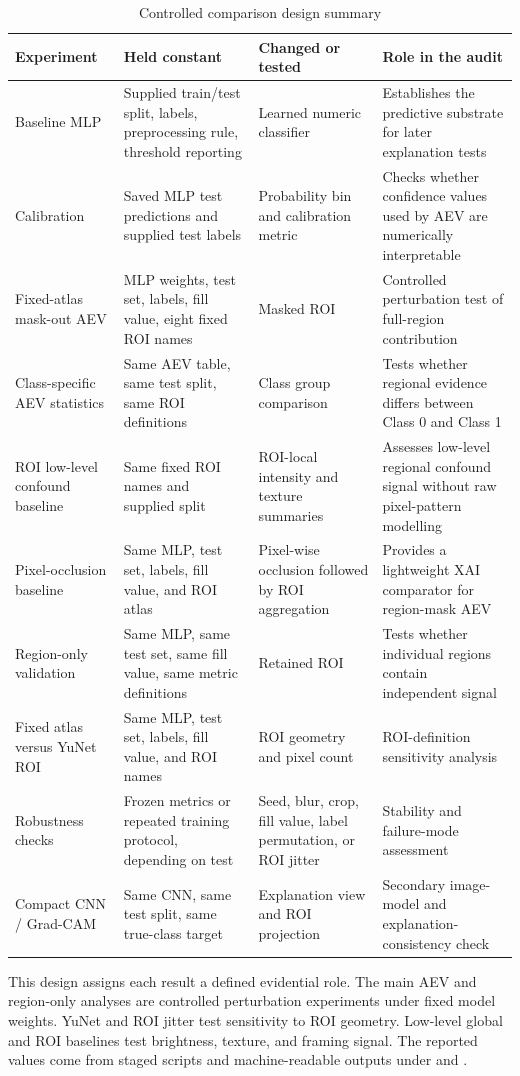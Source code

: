 \begin{table}[htbp]
\centering
\scriptsize
\caption{Controlled comparison design summary}
\begin{tabularx}{\textwidth}{>{\raggedright\arraybackslash}X>{\raggedright\arraybackslash}X>{\raggedright\arraybackslash}X>{\raggedright\arraybackslash}X}
\toprule
Experiment & Held constant & Changed or tested & Role in the audit \\
\midrule
Baseline MLP & Supplied train/test split, labels, preprocessing rule, threshold reporting & Learned numeric classifier & Establishes the predictive substrate for later explanation tests \\
Calibration & Saved MLP test predictions and supplied test labels & Probability bin and calibration metric & Checks whether confidence values used by AEV are numerically interpretable \\
Fixed-atlas mask-out AEV & MLP weights, test set, labels, fill value, eight fixed ROI names & Masked ROI & Controlled perturbation test of full-region contribution \\
Class-specific AEV statistics & Same AEV table, same test split, same ROI definitions & Class group comparison & Tests whether regional evidence differs between Class 0 and Class 1 \\
ROI low-level confound baseline & Same fixed ROI names and supplied split & ROI-local intensity and texture summaries & Assesses low-level regional confound signal without raw pixel-pattern modelling \\
Pixel-occlusion baseline & Same MLP, test set, labels, fill value, and ROI atlas & Pixel-wise occlusion followed by ROI aggregation & Provides a lightweight XAI comparator for region-mask AEV \\
Region-only validation & Same MLP, same test set, same fill value, same metric definitions & Retained ROI & Tests whether individual regions contain independent signal \\
Fixed atlas versus YuNet ROI & Same MLP, test set, labels, fill value, and ROI names & ROI geometry and pixel count & ROI-definition sensitivity analysis \\
Robustness checks & Frozen metrics or repeated training protocol, depending on test & Seed, blur, crop, fill value, label permutation, or ROI jitter & Stability and failure-mode assessment \\
Compact CNN / Grad-CAM & Same CNN, same test split, same true-class target & Explanation view and ROI projection & Secondary image-model and explanation-consistency check \\
\bottomrule
\end{tabularx}
\end{table}

This design assigns each result a defined evidential role. The main AEV and region-only analyses are controlled perturbation experiments under fixed model weights. YuNet and ROI jitter test sensitivity to ROI geometry. Low-level global and ROI baselines test brightness, texture, and framing signal. The reported values come from staged scripts and machine-readable outputs under  and .


